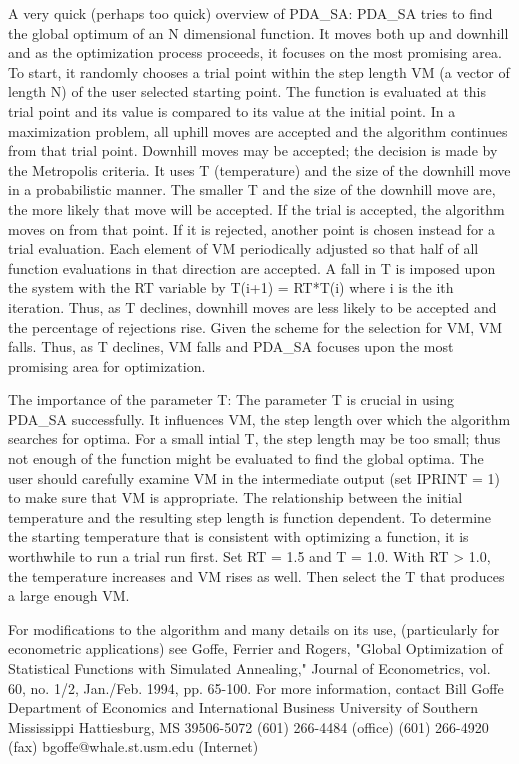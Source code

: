 \documentclass[11pt,twoside,nolof]{starlink}
\begin{document}
\begin{terminalv}
  A very quick (perhaps too quick) overview of PDA_SA:
     PDA_SA tries to find the global optimum of an N dimensional function.
  It moves both up and downhill and as the optimization process
  proceeds, it focuses on the most promising area.
     To start, it randomly chooses a trial point within the step length
  VM (a vector of length N) of the user selected starting point. The
  function is evaluated at this trial point and its value is compared
  to its value at the initial point.
     In a maximization problem, all uphill moves are accepted and the
  algorithm continues from that trial point. Downhill moves may be
  accepted; the decision is made by the Metropolis criteria. It uses T
  (temperature) and the size of the downhill move in a probabilistic
  manner. The smaller T and the size of the downhill move are, the more
  likely that move will be accepted. If the trial is accepted, the
  algorithm moves on from that point. If it is rejected, another point
  is chosen instead for a trial evaluation.
     Each element of VM periodically adjusted so that half of all
  function evaluations in that direction are accepted.
     A fall in T is imposed upon the system with the RT variable by
  T(i+1) = RT*T(i) where i is the ith iteration. Thus, as T declines,
  downhill moves are less likely to be accepted and the percentage of
  rejections rise. Given the scheme for the selection for VM, VM falls.
  Thus, as T declines, VM falls and PDA_SA focuses upon the most promising
  area for optimization.

  The importance of the parameter T:
     The parameter T is crucial in using PDA_SA successfully. It influences
  VM, the step length over which the algorithm searches for optima. For
  a small intial T, the step length may be too small; thus not enough
  of the function might be evaluated to find the global optima. The user
  should carefully examine VM in the intermediate output (set IPRINT =
  1) to make sure that VM is appropriate. The relationship between the
  initial temperature and the resulting step length is function
  dependent.
     To determine the starting temperature that is consistent with
  optimizing a function, it is worthwhile to run a trial run first. Set
  RT = 1.5 and T = 1.0. With RT > 1.0, the temperature increases and VM
  rises as well. Then select the T that produces a large enough VM.

  For modifications to the algorithm and many details on its use,
  (particularly for econometric applications) see Goffe, Ferrier
  and Rogers, "Global Optimization of Statistical Functions with
  Simulated Annealing," Journal of Econometrics, vol. 60, no. 1/2,
  Jan./Feb. 1994, pp. 65-100.
  For more information, contact
              Bill Goffe
              Department of Economics and International Business
              University of Southern Mississippi
              Hattiesburg, MS  39506-5072
              (601) 266-4484 (office)
              (601) 266-4920 (fax)
              bgoffe@whale.st.usm.edu (Internet)


\end{terminalv}
\end{document}
